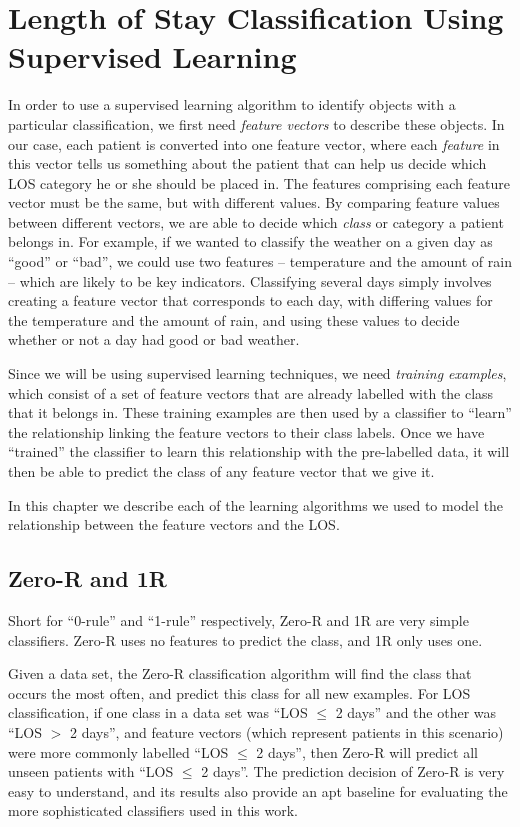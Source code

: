 \chapter{Length of Stay Classification Using Supervised Learning}
  \label{chap:classification}

In order to use a supervised learning algorithm to identify objects with
a particular classification, we first need \textit{feature vectors} to
describe these objects. In our case, each patient is converted into one
feature vector, where each \textit{feature} in this vector tells us
something about the
patient that can help us decide which LOS category he or she should be
placed in. The features comprising each feature vector must be the same,
but with different values. By comparing feature values between different
vectors, we are able to decide which \textit{class} or category a patient
belongs in. For example, if we wanted to classify the weather on a given
day as ``good'' or ``bad'', we could use two features -- temperature and
the amount of rain -- which are likely to be key indicators. Classifying
several days simply involves creating a feature vector that corresponds
to each day, with differing values for the temperature and the amount of
rain, and using these values to decide whether or not a day had good or
bad weather.

Since we will be using supervised learning techniques, we need
\textit{training examples}, which consist of a set of feature vectors
that are already labelled with the class that it belongs in. These
training examples are then used by a classifier to ``learn'' the
relationship linking the feature vectors to their class labels. Once we have
``trained'' the classifier to learn this relationship with the pre-labelled
data, it will then be able to predict the class of any feature vector that we
give it.

In this
chapter we describe each of the learning algorithms we used to model the
relationship between the feature vectors and the LOS.

\section{Zero-R and 1R}
\label{sec:zeror}
Short for ``0-rule'' and ``1-rule'' respectively, Zero-R and 1R are
very simple classifiers. Zero-R uses no features to predict the class, and
1R only uses one.

Given a data set, the Zero-R classification algorithm will find the class that
occurs the most often, and predict this class for all new examples. For LOS
classification, if one class in a data set was ``LOS $\leq$ 2 days'' and
the other was
``LOS $>$ 2 days'', and feature vectors (which represent patients in this
scenario) were more commonly labelled ``LOS $\leq$ 2 days'', then Zero-R will
predict all unseen patients with ``LOS $\leq$ 2 days''.
The prediction decision of Zero-R is very easy to understand,
and its results also provide an apt baseline for evaluating the more
sophisticated classifiers used in this work.

